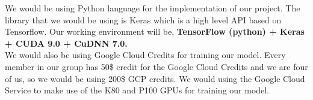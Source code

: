 \documentclass{article}
\begin{document}
We would be using Python language for the implementation of our project. The library that we would be using is Keras which is a high level API based on Tensorflow. Our working environment will be,
\textbf{TensorFlow (python) + Keras + CUDA 9.0 + CuDNN 7.0.}\\
We would also be using Google Cloud Credits for training our model. Every member in our group has 50\$ credit for the Google Cloud Credits and we are four of us, so we would be using 200\$ GCP credits. We would using the Google Cloud Service to make use of the K80 and P100 GPUs for training our model.


%

\end{document}
